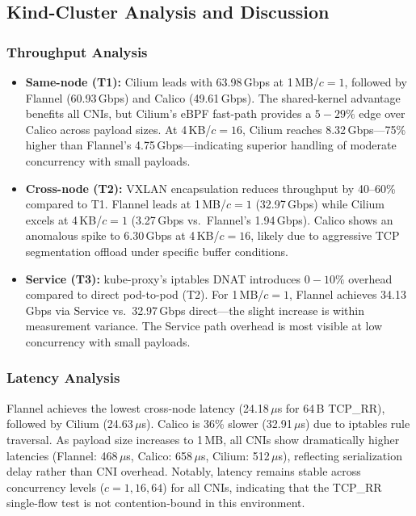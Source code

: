 \documentclass[11pt,a4paper]{article}
\begin{document}
\subsection{Kind-Cluster Analysis and Discussion}

\subsubsection{Throughput Analysis}

\begin{itemize}
  \item \textbf{Same-node (T1):} Cilium leads with 63.98\,Gbps at 1\,MB/$c{=}1$, followed by Flannel (60.93\,Gbps) and Calico (49.61\,Gbps). The shared-kernel advantage benefits all CNIs, but Cilium's eBPF fast-path provides a $5{-}29\%$ edge over Calico across payload sizes. At 4\,KB/$c{=}16$, Cilium reaches 8.32\,Gbps---75\% higher than Flannel's 4.75\,Gbps---indicating superior handling of moderate concurrency with small payloads.
  \item \textbf{Cross-node (T2):} VXLAN encapsulation reduces throughput by 40--60\% compared to T1. Flannel leads at 1\,MB/$c{=}1$ (32.97\,Gbps) while Cilium excels at 4\,KB/$c{=}1$ (3.27\,Gbps vs.\ Flannel's 1.94\,Gbps). Calico shows an anomalous spike to 6.30\,Gbps at 4\,KB/$c{=}16$, likely due to aggressive TCP segmentation offload under specific buffer conditions.
  \item \textbf{Service (T3):} kube-proxy's iptables DNAT introduces $0{-}10\%$ overhead compared to direct pod-to-pod (T2). For 1\,MB/$c{=}1$, Flannel achieves 34.13\,Gbps via Service vs.\ 32.97\,Gbps direct---the slight increase is within measurement variance. The Service path overhead is most visible at low concurrency with small payloads.
\end{itemize}

\subsubsection{Latency Analysis}

Flannel achieves the lowest cross-node latency (24.18\,$\mu$s for 64\,B TCP\_RR), followed by Cilium (24.63\,$\mu$s). Calico is 36\% slower (32.91\,$\mu$s) due to iptables rule traversal. As payload size increases to 1\,MB, all CNIs show dramatically higher latencies (Flannel: 468\,$\mu$s, Calico: 658\,$\mu$s, Cilium: 512\,$\mu$s), reflecting serialization delay rather than CNI overhead. Notably, latency remains stable across concurrency levels ($c{=}1,16,64$) for all CNIs, indicating that the TCP\_RR single-flow test is not contention-bound in this environment.
\end{document}
